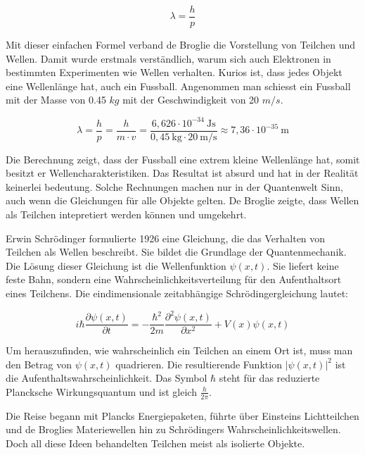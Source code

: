 	\begin{equation}
		\lambda = \frac{h}{p}
	\end{equation}	
	
	Mit dieser einfachen Formel verband de Broglie die Vorstellung von Teilchen und Wellen. Damit wurde erstmals verständlich, warum sich auch Elektronen in bestimmten Experimenten wie Wellen verhalten.
	Kurios ist, dass jedes Objekt eine Wellenlänge hat, auch ein Fussball.
	Angenommen man schiesst ein Fussball mit der Masse von 0.45 $kg$ mit der Geschwindigkeit von 20 $m/s$.
	
	\begin{equation}
		\lambda = \frac{h}{p} = \frac{h}{m \cdot v} = 	\frac{6{,}626 \cdot 10^{-34} \ \text{Js}}{0{,}45 \ \text{kg} \cdot 20 \ \text{m/s}} \approx 7{,}36 \cdot 10^{-35} \ \text{m}
	\end{equation}	
	
	Die Berechnung zeigt, dass der Fussball eine extrem kleine Wellenlänge hat, somit besitzt er Wellencharakteristiken.
	Das Resultat ist absurd und hat in der Realität keinerlei bedeutung.
	Solche Rechnungen machen nur in der Quantenwelt Sinn, auch wenn die Gleichungen für alle Objekte gelten. 
	De Broglie zeigte, dass Wellen als Teilchen intepretiert werden können und umgekehrt. 
	
	
	
	Erwin Schrödinger formulierte 1926 eine Gleichung, die das Verhalten von Teilchen als Wellen beschreibt. 
	Sie bildet die Grundlage der Quantenmechanik. Die Lösung dieser Gleichung ist die Wellenfunktion \( \psi(x, t) \). Sie liefert keine feste Bahn, sondern eine Wahrscheinlichkeitsverteilung für den Aufenthaltsort eines Teilchens.  
	Die eindimensionale zeitabhängige Schrödingergleichung lautet:
	
	\begin{equation}
		i \hbar \frac{\partial \psi(x,t)}{\partial t} = -\frac{\hbar^2}{2m} \frac{\partial^2 \psi(x,t)}{\partial x^2} + V(x) \psi(x,t)
	\end{equation}
	
	
	Um herauszufinden, wie wahrscheinlich ein Teilchen an einem Ort ist, muss man den Betrag von \( \psi(x, t) \) quadrieren. 
	Die resultierende Funktion \( |\psi(x, t)|^2 \) ist die Aufenthaltswahrscheinlichkeit. 
	Das Symbol \( \hbar \) steht für das reduzierte Plancksche Wirkungsquantum und ist gleich \( \frac{h}{2\pi} \). 
	
	Die Reise begann mit Plancks Energiepaketen, führte über Einsteins Lichtteilchen und de Broglies Materiewellen hin zu Schrödingers Wahrscheinlichkeitswellen. 
	Doch all diese Ideen behandelten Teilchen meist als isolierte Objekte.
	

